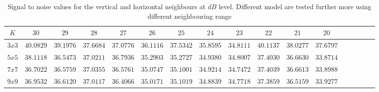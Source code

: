   
  \begin{table}[!htbp]
\centering
\caption{Signal to noise values for the  vertical and horizontal neighbours at $dB$ level. Different model are tested further more using different neighbouring range}\label{niceday1}
\label{table:55}
\begin{tabular}{c c c c c c c c c c c c c c c c c} 
  \hline  
$K$&$30$&$29$&$28$&$27$&$26$&$25$&$24$&$23$&$22$&$21$&$20$\\
  \hline  
$3x3$&$40.0829$&$39.1976$&$37.6684$&$37.0776$&$36.1116$&$37.5342$&$35.8595$&$34.8111$&\textbf{\textit{$40.1137$}}&$38.0277$&$37.6797$\\
$5x5$&$38.1118$&$36.5473$&$37.0211$&$36.7936$&$35.2903$&$35.2727$&$34.9380$&$34.8007$&$37.4030$&$36.6630$&$33.8714$\\
$7x7$&$36.7022$&$36.5759$&$37.0355$&$36.5761$&$35.0747$&$35.1001$&$34.9214$&$34.7472$&$37.4039$&$36.6613$&$33.8988$\\
$9x9$&$36.9532$&$36.6120$&$37.0117$&$36.4066$&$35.0171$&$35.1019$&$34.8839$&$34.7718$&$37.3859$&$36.5159$&$33.9277$\\
 \hline
\end{tabular}
\end{table}



